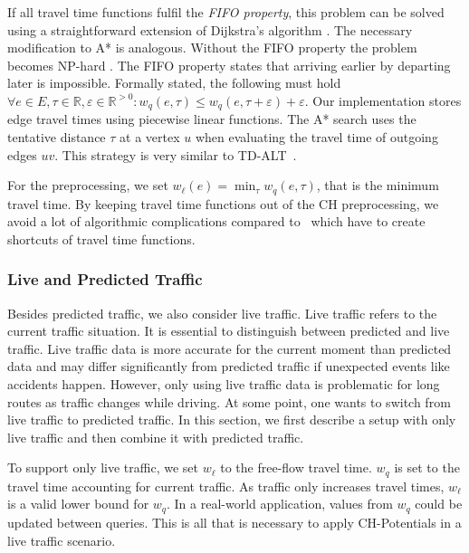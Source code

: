 \documentclass[manuscript]{acmart}
\begin{document}
If all travel time functions fulfil the \emph{FIFO property}, this problem can be solved using a straightforward extension of Dijkstra's algorithm \cite{d-aassp-69}.
The necessary modification to A* is analogous.
Without the FIFO property the problem becomes NP-hard \cite{or-tnp-89,z-nphsp-22}.
The FIFO property states that arriving earlier by departing later is impossible.
Formally stated, the following must hold $\forall e\in E,\tau\in \mathbb{R},\varepsilon\in \mathbb{R}^{>0}: w_q(e, \tau) \le w_q(e, \tau+\varepsilon) + \varepsilon$.
Our implementation stores edge travel times using piecewise linear functions.
The A* search uses the tentative distance $\tau$ at a vertex $u$ when evaluating the travel time of outgoing edges $u v$.
This strategy is very similar to TD-ALT~\cite{ndls-bastd-12,dw-lbrdg-07}.

For the preprocessing, we set $w_\ell(e) = \min_\tau w_q(e,\tau)$, that is the minimum travel time.
By keeping travel time functions out of the CH preprocessing, we avoid a lot of algorithmic complications compared to~\cite{bgsv-mtdtt-13,bdpw-dtdrp-16,swz-sfert-21,dn-crdtd-12} which have to create shortcuts of travel time functions.

\subsubsection{Live and Predicted Traffic}
\label{sec:live-predicted-traffic}

Besides predicted traffic, we also consider live traffic.
Live traffic refers to the current traffic situation.
It is essential to distinguish between predicted and live traffic.
Live traffic data is more accurate for the current moment than predicted data and may differ significantly from predicted traffic if unexpected events like accidents happen.
However, only using live traffic data is problematic for long routes as traffic changes while driving.
At some point, one wants to switch from live traffic to predicted traffic.
In this section, we first describe a setup with only live traffic and then combine it with predicted traffic.

To support only live traffic, we set $w_\ell$ to the free-flow travel time.
$w_q$ is set to the travel time accounting for current traffic.
As traffic only increases travel times, $w_\ell$ is a valid lower bound for $w_q$.
In a real-world application, values from $w_q$ could be updated between queries.
This is all that is necessary to apply CH-Potentials in a live traffic scenario.
\end{document}
